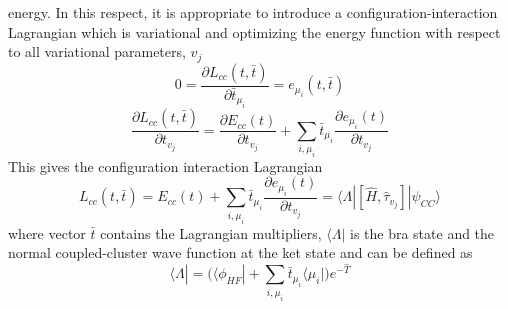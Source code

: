 \documentclass[a4paper,11pt]{report}
\begin{document}
energy. In this respect, it is appropriate to introduce a configuration-interaction Lagrangian
which is variational and optimizing the energy function with respect to all variational parameters, $v_{j}$  
\citep{kongsted2003coupled}
\begin{equation}\label{aede3}
0 = \frac{\partial L_{cc}(t,\bar{t})}{\partial\bar{t}_{\mu_{i}}} = e_{\mu_{i}}(t,\bar{t})
\end{equation}
\begin{equation}\label{aede4}
\frac{\partial L_{cc}(t,\bar{t})}{\partial t_{v_{j}}} = \frac{\partial E_{cc}(t)}{\partial t_{v_{j}}} + \sum_{i,\mu_{i}}\bar{t}_{\mu_{i}}\frac{\partial e_{\mu_{i}}(t)}{\partial t_{v_{j}}}
\end{equation}
This gives the configuration interaction Lagrangian
\begin{equation}\label{aede5}
L_{cc}(t,\bar{t}) = E_{cc}(t)+ \sum_{i,\mu_{i}}\bar{t}_{\mu_{i}} 
\frac{\partial e_{\mu_{i}}(t)}{\partial t_{v_{j}}} = \big \langle \Lambda|[\hat{H}, \hat{\tau}_{v_{j}}]|\psi_{CC}\big \rangle 
\end{equation}
where vector $\bar{t}$ contains the Lagrangian multipliers, $\big \langle \Lambda|$ is the bra state and the normal coupled-cluster wave function at the ket state and can be defined as
\begin{equation}\label{aede6}
\big \langle \Lambda| = \big(\big \langle \phi_{HF}|+\sum_{i,\mu_{i}}\bar{t}_{\mu_{i}}\big \langle \mu_{i}|\big)e^{-\hat{T}}
\end{equation}
\end{document}
